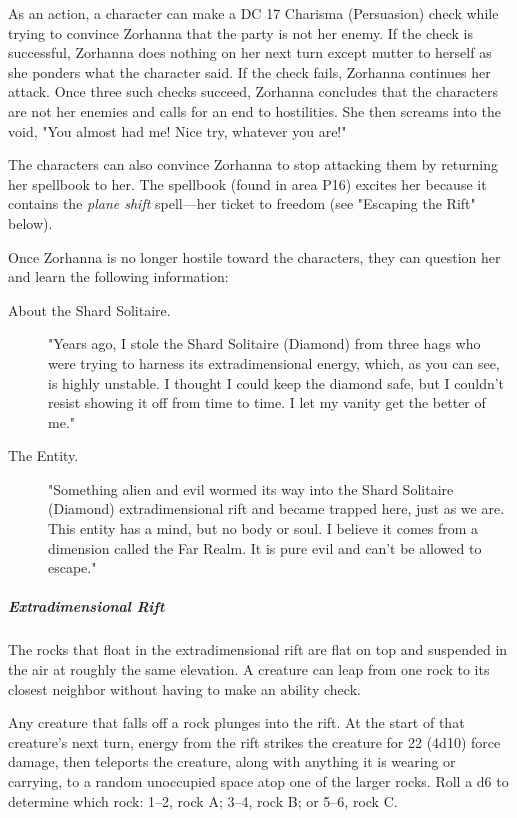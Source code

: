 \documentclass[10pt,a4paper,twoside,bg=print,twocolumn,openany,nodeprecatedcode]{dndbook}
\begin{document}
As an action, a character can make a DC 17 Charisma (Persuasion) check while trying to convince Zorhanna that the party is not her enemy. If the check is successful, Zorhanna does nothing on her next turn except mutter to herself as she ponders what the character said. If the check fails, Zorhanna continues her attack. Once three such checks succeed, Zorhanna concludes that the characters are not her enemies and calls for an end to hostilities. She then screams into the void, "You almost had me! Nice try, whatever you are!"

The characters can also convince Zorhanna to stop attacking them by returning her spellbook to her. The spellbook (found in area P16) excites her because it contains the \textit{plane shift} spell—her ticket to freedom (see "Escaping the Rift" below).

Once Zorhanna is no longer hostile toward the characters, they can question her and learn the following information:


\begin{description}
\item[About the Shard Solitaire.]
"Years ago, I stole the Shard Solitaire (Diamond) from three hags who were trying to harness its extradimensional energy, which, as you can see, is highly unstable. I thought I could keep the diamond safe, but I couldn't resist showing it off from time to time. I let my vanity get the better of me."
\item[The Entity.]
"Something alien and evil wormed its way into the Shard Solitaire (Diamond) extradimensional rift and became trapped here, just as we are. This entity has a mind, but no body or soul. I believe it comes from a dimension called the Far Realm. It is pure evil and can't be allowed to escape."
\end{description}

\subparagraph{Extradimensional Rift}
The rocks that float in the extradimensional rift are flat on top and suspended in the air at roughly the same elevation. A creature can leap from one rock to its closest neighbor without having to make an ability check.

Any creature that falls off a rock plunges into the rift. At the start of that creature's next turn, energy from the rift strikes the creature for 22 (4d10) force damage, then teleports the creature, along with anything it is wearing or carrying, to a random unoccupied space atop one of the larger rocks. Roll a d6 to determine which rock: 1–2, rock A; 3–4, rock B; or 5–6, rock C.
\end{document}
